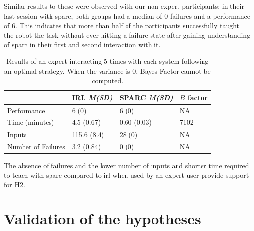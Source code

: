 Similar results to these were observed with our non-expert participants: in their last session with \gls{sparc}, both groups had a median of 0 failures and a performance of 6. This indicates that more than half of the participants successfully taught the robot the task without ever hitting a failure state after gaining understanding of \gls{sparc} in their first and second interaction with it.

\begin{table}[ht]
	\centering
	\caption{Results of an expert interacting 5 times with each system following an optimal strategy. When the variance is 0, Bayes Factor cannot be computed.}
	\label{tab:control_expert}
	\begin{tabular}{@{}llll@{}}\toprule
	&IRL \textit{M(SD)} & SPARC \textit{M(SD)} & $B$ factor\\
		\midrule
		Performance & 6 (0) & 6 (0) & NA \\
		Time (minutes) & 4.5 (0.67) & 0.60 (0.03) & 7102 \\
		Inputs & 115.6 (8.4) & 28 (0) & NA \\
		Number of Failures & 3.2 (0.84) & 0 (0) & NA \\
		\bottomrule
	\end{tabular}
\end{table}

The absence of failures and the lower number of inputs and shorter time required to teach with \gls{sparc} compared to \gls{irl} when used by an expert user provide support for H2.

\section{Validation of the hypotheses}

